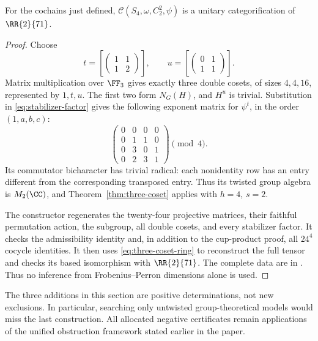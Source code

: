\begin{theorem}\label{thm:s4-model}
For the cochains just defined,
$\mathcal C(S_4,\omega,C_2^2,\psi)$ is a unitary categorification of
$\RR{2}{71}$.
\end{theorem}
\begin{proof}
Choose
\[
 t=\left[\begin{pmatrix}1&1\\1&2\end{pmatrix}\right],\qquad
 u=\left[\begin{pmatrix}0&1\\1&1\end{pmatrix}\right].
\]
Matrix multiplication over $\FF_3$ gives exactly three double cosets,
of sizes $4,4,16$, represented by $1,t,u$. The first two form
$N_G(H)$, and $H^u$ is trivial. Substitution in
\eqref{eq:stabilizer-factor} gives the following exponent matrix for
$\psi^t$, in the order $(1,a,b,c)$:
\[
 \begin{pmatrix}
 0&0&0&0\\0&1&1&0\\0&3&0&1\\0&2&3&1
 \end{pmatrix}\pmod4.
\]
Its commutator bicharacter has trivial radical: each nonidentity row
has an entry different from the corresponding transposed entry.
Thus its twisted group algebra is $M_2(\CC)$, and
Theorem~\ref{thm:three-coset} applies with $h=4$, $s=2$.

The constructor regenerates the twenty-four projective matrices, their
faithful permutation action, the subgroup, all double cosets, and every
stabilizer factor. It checks the admissibility identity and, in addition
to the cup-product proof, all $24^4$ cocycle identities. It then uses
\eqref{eq:three-coset-ring} to reconstruct the full tensor and checks its
based isomorphism with $\RR{2}{71}$. The complete data are in
. Thus no inference from
Frobenius--Perron dimensions alone is used.
\end{proof}

The three additions in this section are positive determinations, not
new exclusions. In particular, searching only untwisted group-theoretical
models would miss the last construction. All allocated negative
certificates remain applications of the unified obstruction framework
stated earlier in the paper.



